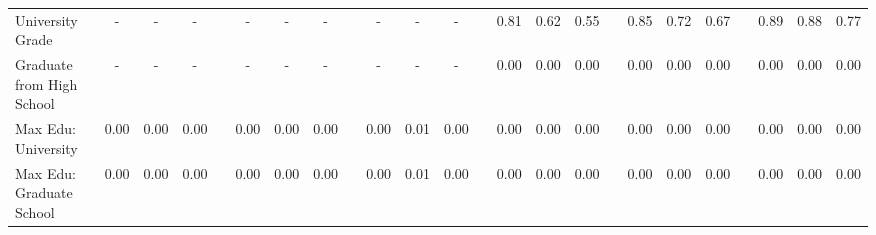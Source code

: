 \begin{center}
{\begin{longtable}{L{12em} c c c p{1.2em} c c c p{1.2em} c c c p{1.2em} c c c p{1.2em} c c c p{1.2em} c c c}
University Grade & - & - & - & & - & - & - & & - & - & - & &      0.81 &      0.62 &      0.55 & &      0.85 &      0.72 &      0.67 & &      0.89 &      0.88 &      0.77 \\[.3em]
Graduate from High School & - & - & - & & - & - & - & & - & - & - & &      0.00 &      0.00 &      0.00 & &      0.00 &      0.00 &      0.00 & &      0.00 &      0.00 &      0.00 \\[.3em]
Max Edu: University & 0.00 &      0.00 &      0.00 & &      0.00 &      0.00 &      0.00 & &      0.00 &      0.01 &      0.00 & &      0.00 &      0.00 &      0.00 & &      0.00 &      0.00 &      0.00 & &      0.00 &      0.00 &      0.00 \\[.3em]
Max Edu: Graduate School & 0.00 &      0.00 &      0.00 & &      0.00 &      0.00 &      0.00 & &      0.00 &      0.01 &      0.00 & &      0.00 &      0.00 &      0.00 & &      0.00 &      0.00 &      0.00 & &      0.00 &      0.00 &      0.00 \\[.3em]
\hline
\end{longtable}
}
\end{center}
